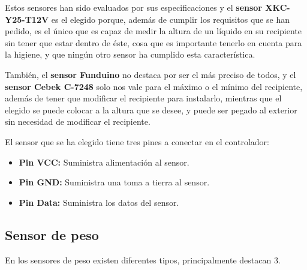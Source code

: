 Estos sensores han sido evaluados por sus especificaciones y el \textbf{sensor XKC-Y25-T12V} es el elegido porque, además de cumplir los requisitos que se han pedido, es el único que es capaz de medir la altura de un líquido en su recipiente sin tener que estar dentro de éste, cosa que es importante tenerlo en cuenta para la higiene, y que ningún otro sensor ha cumplido esta característica.

También, el \textbf{sensor Funduino} no destaca por ser el más preciso de todos, y el \textbf{sensor Cebek C-7248} solo nos vale para el máximo o el mínimo del recipiente, además de tener que modificar el recipiente para instalarlo, mientras que el elegido se puede colocar a la altura que se desee, y puede ser pegado al exterior sin necesidad de modificar el recipiente.

El sensor que se ha elegido tiene tres pines a conectar en el controlador: 
\begin{itemize}
    \item \textbf{Pin VCC:} Suministra alimentación al sensor.
    \item \textbf{Pin GND:} Suministra una toma a tierra al sensor.
    \item \textbf{Pin Data:} Suministra los datos del sensor.
\end{itemize}

\subsection{Sensor de peso}

En los sensores de peso existen diferentes tipos, principalmente destacan 3.

